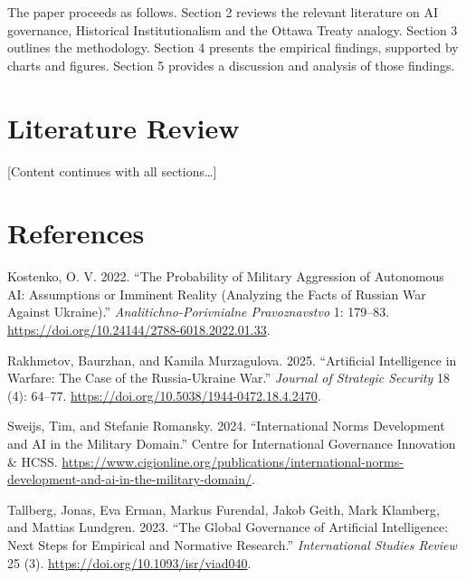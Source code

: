 \documentclass[
  12pt,
]{article}
\newlength{\cslhangindent}
\newenvironment{CSLReferences}[2] %
 {\begin{list}{}{%
  \setlength{\itemindent}{0pt}
  \setlength{\leftmargin}{0pt}
  \setlength{\parsep}{0pt}
  \ifodd #1
   \setlength{\leftmargin}{\cslhangindent}
   \setlength{\itemindent}{-1\cslhangindent}
  \fi
  \setlength{\itemsep}{#2\baselineskip}}}
 {\end{list}}
\begin{document}
The paper proceeds as follows. Section 2 reviews the relevant literature
on AI governance, Historical Institutionalism and the Ottawa Treaty
analogy. Section 3 outlines the methodology. Section 4 presents the
empirical findings, supported by charts and figures. Section 5 provides
a discussion and analysis of those findings.

\section{Literature Review}\label{literature-review}

{[}Content continues with all sections\ldots{]}

\section*{References}\label{references}

\label{refs}
\begin{CSLReferences}{1}{0}
Kostenko, O. V. 2022. {``The Probability of Military Aggression of
Autonomous {AI}: Assumptions or Imminent Reality (Analyzing the Facts of
{Russian} War Against {Ukraine}).''} \emph{Analitichno-Porivnialne
Pravoznavstvo} 1: 179--83.
\url{https://doi.org/10.24144/2788-6018.2022.01.33}.

Rakhmetov, Baurzhan, and Kamila Murzagulova. 2025. {``Artificial
Intelligence in Warfare: The Case of the Russia-Ukraine War.''}
\emph{Journal of Strategic Security} 18 (4): 64--77.
\url{https://doi.org/10.5038/1944-0472.18.4.2470}.

Sweijs, Tim, and Stefanie Romansky. 2024. {``International Norms
Development and {AI} in the Military Domain.''} Centre for International
Governance Innovation \& HCSS.
\url{https://www.cigionline.org/publications/international-norms-development-and-ai-in-the-military-domain/}.

Tallberg, Jonas, Eva Erman, Markus Furendal, Jakob Geith, Mark Klamberg,
and Mattias Lundgren. 2023. {``The Global Governance of Artificial
Intelligence: Next Steps for Empirical and Normative Research.''}
\emph{International Studies Review} 25 (3).
\url{https://doi.org/10.1093/isr/viad040}.

\end{CSLReferences}
\end{document}
